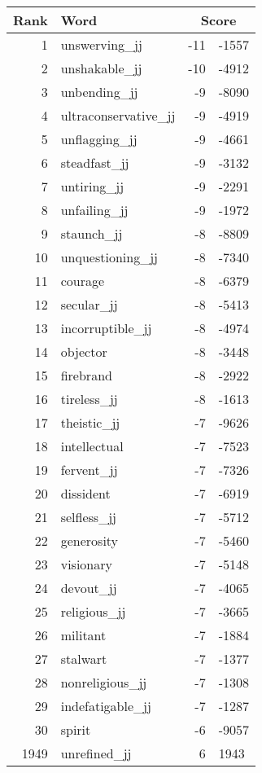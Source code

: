 \begin{longtable}[!htbp]{| rlr@{.}l |}
    \hline
    \textbf{Rank} & \textbf{Word} & \multicolumn{2}{c|}{\textbf{Score}} \\
    \hline
    \endhead
    1 & unswerving\_jj & -11 & -1557 \\
    2 & unshakable\_jj & -10 & -4912 \\
    3 & unbending\_jj & -9 & -8090 \\
    4 & ultraconservative\_jj & -9 & -4919 \\
    5 & unflagging\_jj & -9 & -4661 \\
    6 & steadfast\_jj & -9 & -3132 \\
    7 & untiring\_jj & -9 & -2291 \\
    8 & unfailing\_jj & -9 & -1972 \\
    9 & staunch\_jj & -8 & -8809 \\
    10 & unquestioning\_jj & -8 & -7340 \\
    11 & courage & -8 & -6379 \\
    12 & secular\_jj & -8 & -5413 \\
    13 & incorruptible\_jj & -8 & -4974 \\
    14 & objector & -8 & -3448 \\
    15 & firebrand & -8 & -2922 \\
    16 & tireless\_jj & -8 & -1613 \\
    17 & theistic\_jj & -7 & -9626 \\
    18 & intellectual & -7 & -7523 \\
    19 & fervent\_jj & -7 & -7326 \\
    20 & dissident & -7 & -6919 \\
    21 & selfless\_jj & -7 & -5712 \\
    22 & generosity & -7 & -5460 \\
    23 & visionary & -7 & -5148 \\
    24 & devout\_jj & -7 & -4065 \\
    25 & religious\_jj & -7 & -3665 \\
    26 & militant & -7 & -1884 \\
    27 & stalwart & -7 & -1377 \\
    28 & nonreligious\_jj & -7 & -1308 \\
    29 & indefatigable\_jj & -7 & -1287 \\
    30 & spirit & -6 & -9057 \\
    1949 & unrefined\_jj & 6 & 1943 \\

\end{longtable}
